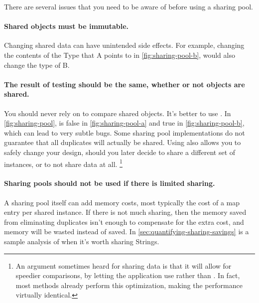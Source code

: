There are several issues that you need to be aware of before using a sharing
pool.
\paragraph{Shared objects must be immutable.} Changing shared data can
have unintended side effects. For example, 
changing the contents of the Type that A points to in
\autoref{fig:sharing-pool-b}, would also change the type of B.

\paragraph{The result of  testing should be the same,
whether or not objects are shared.}
You should never rely on \code{==} to compare shared objects. It's better to use
. In \autoref{fig:sharing-pool},  is
false in \autoref{fig:sharing-pool-a} and true in \autoref{fig:sharing-pool-b}, which can lead to very subtle bugs.
Some sharing pool implementations do not guarantee that all
duplicates will actually be shared. Using  also allows
you to safely change your design, should you later decide to share a different set of instances, or to not share data at all.
\footnote{An argument sometimes heard for sharing data is that it will
allow for speedier comparisons, by letting the application use \code{==} rather
than . In fact, most
  methods already perform this optimization, making the performance virtually identical.}
 
\paragraph{Sharing pools should not be used if there is limited sharing.}
A sharing pool itself can add
memory costs, most typically the cost of a map entry per shared instance.
If there is not much sharing, then the memory saved from
eliminating duplicates isn't enough to compensate for the
extra cost, and memory will be wasted instead of saved.  In \autoref{sec:quantifying-sharing-savings} is
a sample analysis of when it's worth sharing Strings.


